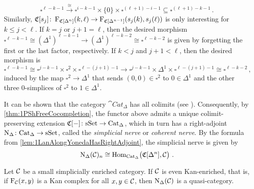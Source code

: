 \begin{con}
	\begin{equation*}
		\square^{\ell-k-1}\overset{\cong}{\longrightarrow}\square^{i-k-1}\times\{0\}\times\square^{(\ell+1)-i-1}\subseteq \square^{(\ell+1)-k-1}\,.
	\end{equation*}
	Similarly, $\mathfrak{C}[s_j]\colon \operatorname{F}_{\mathfrak{C}[\Delta^n]}(k,\ell)\rightarrow\operatorname{F}_{\mathfrak{C}[\Delta^{n-1}]}(s_j(k),s_j(\ell))$ is only interesting for $k\leqslant j<\ell$. If $k=j$ or $j+1=\ell$, then the desired morphism $\square^{\ell-k-1}\cong (\Delta^1)^{\ell-k-1}\rightarrow (\Delta^1)^{\ell-k-2}\cong \square^{\ell-k-2}$ is given by forgetting the first or the last factor, respectively. If $k<j$ and $j+1<\ell$, then the desired morphism is
	\begin{equation*}
		\square^{\ell-k-1}\cong \square^{j-k-1}\times\square^2\times\square^{\ell-(j+1)-1}\longrightarrow\square^{j-k-1}\times\Delta^1\times\square^{\ell-(j+1)-1}\cong \square^{\ell-k-2}\,,
	\end{equation*}
	induced by the map $\square^2\rightarrow\Delta^1$ that sends $(0,0)\in\square^2$ to $0\in\Delta^1$ and the other three $0$-simplices of $\square^2$ to $1\in\Delta^1$.
	
	It can be shown that the category $\cat{Cat}_\Delta$ has all colimits (see \cite[Corollary~1.2.45]{Land}). Consequently, by \cref{thm:1PShFreeCocompletion}, the functor above admits a unique colimit-preserving extension $\mathfrak{C}[-]\colon\mathrm{sSet}\rightarrow \mathrm{Cat}_\Delta$, which in turn has a right-adjoint $\operatorname{N}_\Delta\colon \mathrm{Cat}_\Delta\rightarrow\mathrm{sSet}$, called the \emph{simplicial nerve} or \emph{coherent nerve}. By the formula from \cref{lem:1LanAlongYonedaHasRightAdjoint}, the simplicial nerve is given by
	\begin{equation*}
		\N_\Delta(\Cc)_n\cong \Hom_{\cat{Cat}_\Delta}\lef(\CC[\Delta^n],\Cc\righ)\,.
	\end{equation*}
\end{con}
\begin{lem}\label{lem:SimplicialNerveYieldsQuasiCategories}
	Let $\mathcal{C}$ be a small simplicially enriched category. If $\mathcal{C}$ is even Kan-enriched, that is, if $\operatorname{F}_{\mathcal{C}}(x,y)$ is a Kan complex for all $x,y\in\mathcal{C}$, then $\operatorname{N}_\Delta(\mathcal{C})$ is a quasi-category.
\end{lem}
